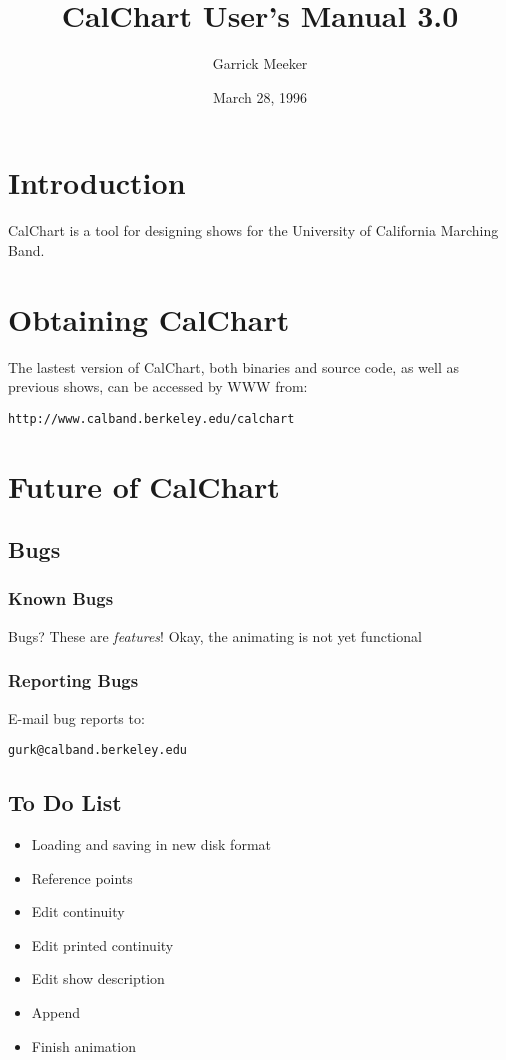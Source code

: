 \title{CalChart User's Manual 3.0}
\author{Garrick Meeker}
\date{March 28, 1996}
\makeindex

\maketitle
\tableofcontents

\chapter{Introduction}

CalChart is a tool for designing shows for the University of California
Marching Band.

\chapter{Obtaining CalChart}

The lastest version of CalChart, both binaries and source code, as well as
previous shows, can be accessed by WWW from:

\begin{verbatim}
http://www.calband.berkeley.edu/calchart
\end{verbatim}

\chapter{Future of CalChart}

\section{Bugs}
\subsection{Known Bugs}
Bugs?  These are {\it features}!
Okay, the animating is not yet functional

\subsection{Reporting Bugs}
E-mail bug reports to:

\begin{verbatim}
gurk@calband.berkeley.edu
\end{verbatim}

\section{To Do List}
\begin{itemize}\itemsep=0pt
\item Loading and saving in new disk format
\item Reference points
\item Edit continuity
\item Edit printed continuity
\item Edit show description
\item Append
\item Finish animation
\end{itemize}


